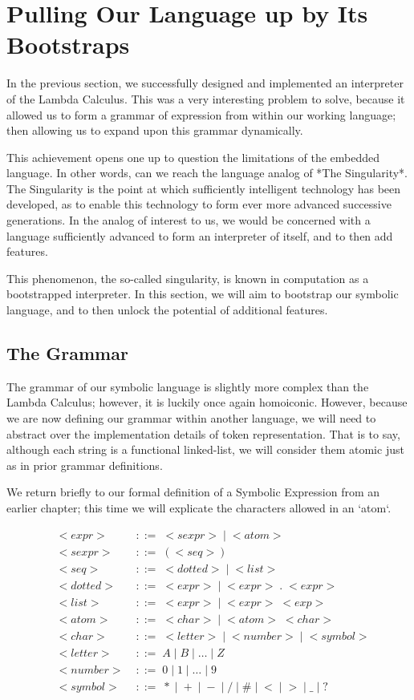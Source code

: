 
\chapter{Pulling Our Language up by Its Bootstraps}
In the previous section, we successfully designed and implemented an
interpreter of the Lambda Calculus. This was a very interesting problem to
solve, because it allowed us to form a grammar of expression from within our working language; then allowing us to expand upon this grammar dynamically.

This achievement opens one up to question the limitations of the embedded
language. In other words, can we reach the language analog of *The 
Singularity*. The Singularity is the point at which sufficiently intelligent 
technology has been developed, as to enable this technology to form ever more 
advanced successive generations. In the analog of interest to us, we would be 
concerned with a language sufficiently advanced to form an interpreter of 
itself, and to then add features.

This phenomenon, the so-called singularity, is known in computation as a 
bootstrapped interpreter. In this section, we will aim to bootstrap our 
symbolic language, and to then unlock the potential of additional features.

\section{The Grammar}
The grammar of our symbolic language is slightly more complex than the Lambda 
Calculus; however, it is luckily once again homoiconic. However, because we 
are now defining our grammar within another language, we will need to 
abstract over the implementation details of token representation. That is to 
say, although each string is a functional linked-list, we will consider them 
atomic just as in prior grammar definitions.

We return briefly to our formal definition of a Symbolic Expression from an 
earlier chapter; this time we will explicate the characters allowed in an 
`atom`.

\begin{align*}
& <expr> \; &::= \; <sexpr> \; | \; <atom>
\\& <sexpr> \; &::= \; (<seq>)
\\& <seq> \; &::= \; <dotted> \; | \; <list>
\\& <dotted> \; &::= \; <expr> \; | \; <expr> \; . \; <expr>
\\& <list> \; &::= \; <expr> \; | \; <expr> \; <exp>
\\& <atom> \; &::= \; <char> \; | \; <atom> \; <char>
\\& <char> \; &::= \; <letter> \; | \; <number> \; | \; <symbol>
\\& <letter> \; &::= \; A \; | \; B \; | \; \dots \; | \; Z
\\& <number> \; &::= \; 0 \; | \; 1 \; | \; \dots \; | \; 9
\\& <symbol> \; &::= \; * \; | \; + \; | \; - \; | \; / \; | \; \# \; | \; < \; | \; > \; | \; \_ \; | \; ?
\end{align*}

